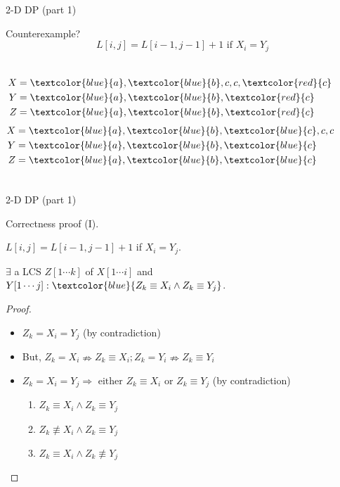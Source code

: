 \begin{frame}{2-D DP (part 1)}
  \begin{alertblock}{Counterexample?}
    \[
      L[i,j] = L[i-1,j-1] + 1 \text{ if } X_{i} = Y_{j}
    \]

    \begin{columns}
	\begin{align*}
	  X &= \textcolor{blue}{a},\textcolor{blue}{b},c,c,\textcolor{red}{c} \\
	  Y &= \textcolor{blue}{a},\textcolor{blue}{b},\textcolor{red}{c}  \\
	  Z &= \textcolor{blue}{a},\textcolor{blue}{b},\textcolor{red}{c}
	\end{align*}
	\begin{align*}
	  X &= \textcolor{blue}{a},\textcolor{blue}{b},\textcolor{blue}{c},c,c \\
	  Y &= \textcolor{blue}{a},\textcolor{blue}{b},\textcolor{blue}{c}  \\
	  Z &= \textcolor{blue}{a},\textcolor{blue}{b},\textcolor{blue}{c}
	\end{align*}
    \end{columns}
  \end{alertblock}
\end{frame}
\begin{frame}{2-D DP (part 1)}
  \begin{block}{Correctness proof (I).}
    \begin{theorem}{}
      $L[i,j] = L[i-1,j-1] + 1$ if $X_{i} = Y_{j}$.
    \end{theorem}

    \begin{theorem}{}
      $\exists$ a LCS $Z[1 \cdots k]$ of $X[1 \cdots i]$ and $Y[1 \cdots j]: \textcolor{blue}{Z_{k} \equiv X_{i} \land Z_{k} \equiv Y_{j}}$.
    \end{theorem}
    \begin{proof}
      \begin{itemize}
	\item $Z_{k} = X_{i} = Y_{j}$ (by contradiction)
	\item But, $Z_{k} = X_{i} \nRightarrow Z_{k} \equiv X_{i}; Z_{k} = Y_{i} \nRightarrow Z_{k} \equiv Y_{i}$ 
	\item $Z_{k} = X_{i} = Y_{j} \Rightarrow \text{ either } Z_{k} \equiv X_{i} \text{ or } Z_{k} \equiv Y_{j}$ (by contradiction)
	  \begin{enumerate}
	    \item $Z_{k} \equiv X_{i} \land Z_{k} \equiv Y_{j}$
	    \item $Z_{k} \not\equiv X_{i} \land Z_{k} \equiv Y_{j}$
	    \item $Z_{k} \equiv X_{i} \land Z_{k} \not\equiv Y_{j}$
	  \end{enumerate}
      \end{itemize}
    \end{proof}
  \end{block}
\end{frame}
